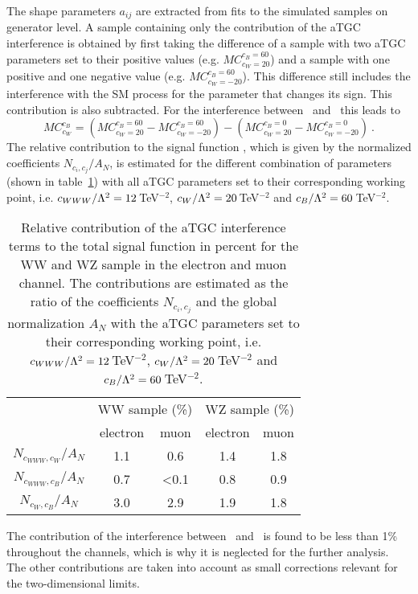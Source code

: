The shape parameters $a_{ij}$ are extracted from fits to the simulated samples on generator level. A sample containing only the contribution of the aTGC interference is obtained by first taking the difference of a sample with two aTGC parameters set to their positive values (e.g. $MC_{c_{W} =20}^{c_{B} =60}$) and a sample with one positive and one negative value (e.g. $MC_{c_{W}=-20}^{c_{B} =60}$). This difference still includes the interference with the SM process for the parameter that changes its sign. This contribution is also subtracted. For the interference between \Tccw \ and \Tcb \ this leads to
\begin{equation}
MC_{c_{W}}^{c_{B}} = \left( MC_{c_{W} =20}^{c_{B} =60}-MC_{c_{W}=-20}^{c_{B} =60} \right) - \left( MC_{c_{W}=20}^{c_B=0}-MC_{c_{W}=-20}^{c_B=0} \right) ~.
\end{equation}
The relative contribution to the signal function , which is given by the normalized coefficients $N_{c_i,c_j}/A_N$, is estimated for the different combination of parameters (shown in table~\ref{tab:signal:relcoef}) with all aTGC parameters set to their corresponding working point, i.e. $c_{WWW}/\Lambda^2=12$\,TeV$^{-2}$, $c_{W}/\Lambda^2=20$\,TeV$^{-2}$ and $c_{B}/\Lambda^2=60$\,TeV$^{-2}$.
\begin{table}
	\centering
	\caption[Relative contribution of the aTGC interference terms to the total signal function]{Relative contribution of the aTGC interference terms to the total signal function in percent for the WW and WZ sample in the electron and muon channel. The contributions are estimated as the ratio of the coefficients $N_{c_i,c_j}$ and the global normalization $A_N$ with the aTGC parameters set to their corresponding working point, i.e. $c_{WWW}/\Lambda^2=12$\,TeV$^{-2}$, $c_{W}/\Lambda^2=20$\,TeV$^{-2}$ and $c_{B}/\Lambda^2=60$\,TeV$^{-2}$.}
	\label{tab:signal:relcoef}
	\begin{tabular}{ccccc}
	\hline
	 & \multicolumn{2}{c}{WW sample (\%)} & \multicolumn{2}{c}{WZ sample (\%)} \\
	 & electron & muon & electron & muon \\
	\hline
	$N_{c_{WWW},c_W}/A_N$ & 1.1 & 0.6  & 1.4 & 1.8 \\
	$N_{c_{WWW},c_B}/A_N$ & 0.7 & <0.1 & 0.8 & 0.9 \\
	$N_{c_W,c_B}/A_N$     & 3.0 & 2.9  & 1.9 & 1.8 \\
	\hline
	\end{tabular}
\end{table}
The contribution of the interference between \Tcwww \ and \Tcb \ is found to be less than 1\% throughout the channels, which is why it is neglected for the further analysis. 
The other contributions are taken into account as small corrections relevant for the two-dimensional limits.
